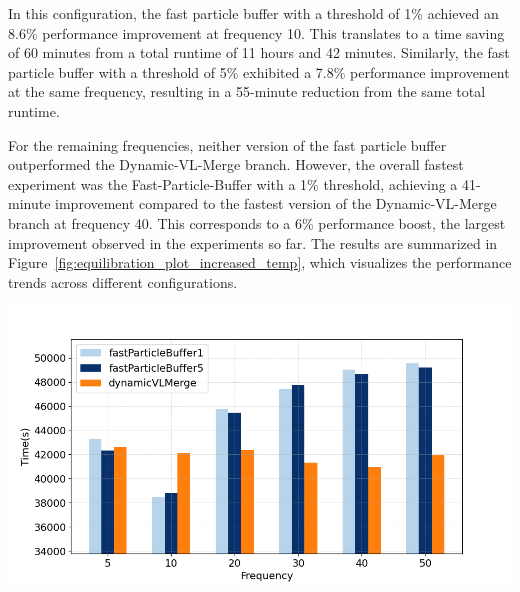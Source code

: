 In this configuration, the fast particle buffer with a threshold of 1\% achieved an 8.6\% performance improvement at frequency 10. This translates to a time saving of 60 minutes from a total runtime of 11 hours and 42 minutes. Similarly, the fast particle buffer with a threshold of 5\% exhibited a 7.8\% performance improvement at the same frequency, resulting in a 55-minute reduction from the same total runtime.

For the remaining frequencies, neither version of the fast particle buffer outperformed the Dynamic-VL-Merge branch. However, the overall fastest experiment was the Fast-Particle-Buffer with a 1\% threshold, achieving a 41-minute improvement compared to the fastest version of the Dynamic-VL-Merge branch at frequency 40. This corresponds to a 6\% performance boost, the largest improvement observed in the experiments so far. The results are summarized in Figure~\ref{fig:equilibration_plot_increased_temp}, which visualizes the performance trends across different configurations.

\begin{center}
\includegraphics[width=0.8\linewidth]{graphs/spinodalDecomposition/vlcc08_increased.png}
\captionsetup{hypcap=false}
\label{fig:equilibration_plot_increased_temp}
\end{center}




